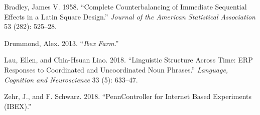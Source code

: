 \documentclass[
  10pt,
  letterpaper,
  DIV=11,
  numbers=noendperiod]{scrartcl}
\newlength{\cslhangindent}
\newlength{\cslentryspacingunit} %
\newenvironment{CSLReferences}[2] %
 {%
  \setlength{\parindent}{0pt}
  \ifodd #1
  \let\oldpar\par
  \def\par{\hangindent=\cslhangindent\oldpar}
  \fi
  \setlength{\parskip}{#2\cslentryspacingunit}
 }%
 {}
\begin{document}
\(~\)

\hypertarget{refs}{}
\begin{CSLReferences}{1}{0}
\leavevmode{}%
Bradley, James V. 1958. {``Complete Counterbalancing of Immediate
Sequential Effects in a Latin Square Design.''} \emph{Journal of the
American Statistical Association} 53 (282): 525--28.

\leavevmode{}%
Drummond, Alex. 2013. {``{\emph{Ibex Farm}}.''}

\leavevmode{}%
Lau, Ellen, and Chia-Hsuan Liao. 2018. {``Linguistic Structure Across
Time: ERP Responses to Coordinated and Uncoordinated Noun Phrases.''}
\emph{Language, Cognition and Neuroscience} 33 (5): 633--47.

\leavevmode{}%
Zehr, J., and F. Schwarz. 2018. {``{PennController for Internet Based
Experiments (IBEX)}.''}

\end{CSLReferences}
\end{document}
